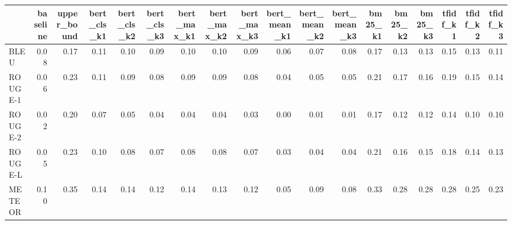 \begin{tabular}{lrrrrrrrrrrrrrrrrr}
\toprule
 & baseline & upper_bound & bert_cls_k1 & bert_cls_k2 & bert_cls_k3 & bert_max_k1 & bert_max_k2 & bert_max_k3 & bert_mean_k1 & bert_mean_k2 & bert_mean_k3 & bm25_k1 & bm25_k2 & bm25_k3 & tfidf_k1 & tfidf_k2 & tfidf_k3 \\
\midrule
BLEU & 0.08 & 0.17 & 0.11 & 0.10 & 0.09 & 0.10 & 0.10 & 0.09 & 0.06 & 0.07 & 0.08 & 0.17 & 0.13 & 0.13 & 0.15 & 0.13 & 0.11 \\
ROUGE-1 & 0.06 & 0.23 & 0.11 & 0.09 & 0.08 & 0.09 & 0.09 & 0.08 & 0.04 & 0.05 & 0.05 & 0.21 & 0.17 & 0.16 & 0.19 & 0.15 & 0.14 \\
ROUGE-2 & 0.02 & 0.20 & 0.07 & 0.05 & 0.04 & 0.04 & 0.04 & 0.03 & 0.00 & 0.01 & 0.01 & 0.17 & 0.12 & 0.12 & 0.14 & 0.10 & 0.10 \\
ROUGE-L & 0.05 & 0.23 & 0.10 & 0.08 & 0.07 & 0.08 & 0.08 & 0.07 & 0.03 & 0.04 & 0.04 & 0.21 & 0.16 & 0.15 & 0.18 & 0.14 & 0.13 \\
METEOR & 0.10 & 0.35 & 0.14 & 0.14 & 0.12 & 0.14 & 0.13 & 0.12 & 0.05 & 0.09 & 0.08 & 0.33 & 0.28 & 0.28 & 0.28 & 0.25 & 0.23 \\
\bottomrule
\end{tabular}
